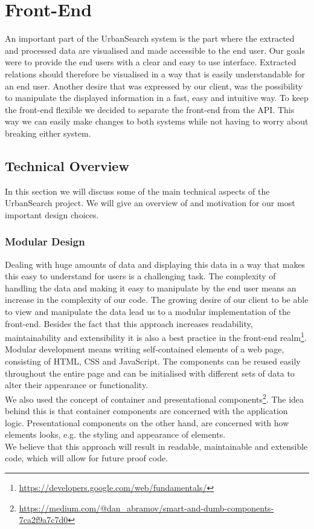 \section{Front-End}\label{sec:5-front-end}
An important part of the UrbanSearch system is the part where the extracted and processed data are visualised and made accessible to the end user. Our goals were to provide the end users with a clear and easy to use interface. Extracted relations should therefore be visualised in a way that is easily understandable for an end user. Another desire that was expressed by our client, was the possibility to manipulate the displayed information in a fast, easy and intuitive way. To keep the front-end flexible we decided to separate the front-end from the API. This way we can easily make changes to both systems while not having to worry about breaking either system.

\subsection{Technical Overview}
In this section we will discuss some of the main technical aspects of the UrbanSearch project. We will give an overview of and motivation for our most important design choices.

\subsubsection{Modular Design}
Dealing with huge amounts of data and displaying this data in a way that makes this easy to understand for users is a challenging task. The complexity of handling the data and making it easy to manipulate by the end user means an increase in the complexity of our code. The growing desire of our client to be able to view and manipulate the data lead us to a modular implementation of the front-end.
Besides the fact that this approach increases readability, maintainability and extensibility it is also a best practice in the front-end realm\footnote{\url{https://developers.google.com/web/fundamentals/}}.\\
Modular development means writing self-contained elements of a web page, consisting of HTML, CSS and JavaScript. The components can be reused easily throughout the entire page and can be initialised with different sets of data to alter their appearance or functionality.\\
We also used the concept of container and presentational components\footnote{\url{https://medium.com/@dan_abramov/smart-and-dumb-components-7ca2f9a7c7d0}}. The idea behind this is that container components are concerned with the application logic. Presentational components on the other hand, are concerned with how elements looks, e.g. the styling and appearance of elements.\\
We believe that this approach will result in readable, maintainable and extensible code, which will allow for future proof code.

